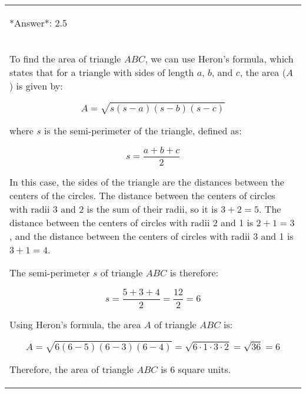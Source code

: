 \begin{table*}[htbp]
\begin{tabular}{p{14cm}}
\begin{tcolorbox}[colback=gray!5, colframe=gray!40, sharp corners, width=\linewidth, boxrule=0.5mm]
*Answer*: 2.5

        \end{tcolorbox}
        

        \begin{tcolorbox}[colback=gray!5, colframe=gray!40, sharp corners, width=\linewidth, boxrule=0.5mm]
        \small
        \textbf{InternLM-XComposer-2.5-7B:}
        \\
To find the area of triangle \(ABC\), we can use Heron's formula, which states that for a triangle with sides of length \(a\), \(b\), and \(c\), the area (\(A\)) is given by:

\[ A = \sqrt{s(s-a)(s-b)(s-c)} \]

where \(s\) is the semi-perimeter of the triangle, defined as:

\[ s = \frac{a + b + c}{2} \]

In this case, the sides of the triangle are the distances between the centers of the circles. The distance between the centers of circles with radii 3 and 2 is the sum of their radii, so it is \(3 + 2 = 5\). The distance between the centers of circles with radii 2 and 1 is \(2 + 1 = 3\), and the distance between the centers of circles with radii 3 and 1 is \(3 + 1 = 4\).

The semi-perimeter \(s\) of triangle \(ABC\) is therefore:

\[ s = \frac{5 + 3 + 4}{2} = \frac{12}{2} = 6 \]

Using Heron's formula, the area \(A\) of triangle \(ABC\) is:

\[ A = \sqrt{6(6-5)(6-3)(6-4)} = \sqrt{6 \cdot 1 \cdot 3 \cdot 2} = \sqrt{36} = 6 \]

Therefore, the area of triangle \(ABC\) is \(6\) square units.

\end{tcolorbox}

\end{tabular}
\caption{A comparison of ViFT with other baseline LVLMs~(part 3).}
\label{tab:case11}
\end{table*}



